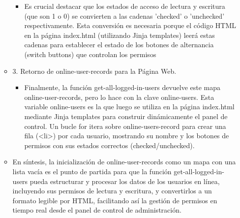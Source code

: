 \documentclass{report}
\begin{document}
\begin{itemize}
\begin{itemize}
\begin{itemize}
\begin{itemize}
                    \end{itemize}
                \item Es crucial destacar que los estados de acceso de lectura y escritura (que son 1 o 0) se convierten a las cadenas 'checked' o 'unchecked' 
                respectivamente. Esta conversión es necesaria porque el código HTML en la página index.html (utilizando Jinja templates) leerá estas cadenas 
                para establecer el estado de los botones de alternancia (switch buttons) que controlan los permisos
            \end{itemize}
        \item 3. Retorno de online-user-records para la Página Web.
            \begin{itemize}
                \item Finalmente, la función get-all-logged-in-users devuelve este mapa online-user-records, pero lo hace con la clave online-users. 
                Esta variable online-users es la que luego se utiliza en la página index.html mediante Jinja templates para construir dinámicamente el 
                panel de control. Un bucle for itera sobre online-users-record para crear una fila (<li>) por cada usuario, mostrando su nombre y los 
                botones de permisos con sus estados correctos (checked/unchecked).
            \end{itemize}
        \item En síntesis, la inicialización de online-user-records como un mapa con una lista vacía es el punto de partida para que la función 
        get-all-logged-in-users pueda estructurar y procesar los datos de los usuarios en línea, incluyendo sus permisos de lectura y escritura, y 
        convertirlos a un formato legible por HTML, facilitando así la gestión de permisos en tiempo real desde el panel de control de administración.
    \end{itemize}


\end{itemize}
\end{document}
